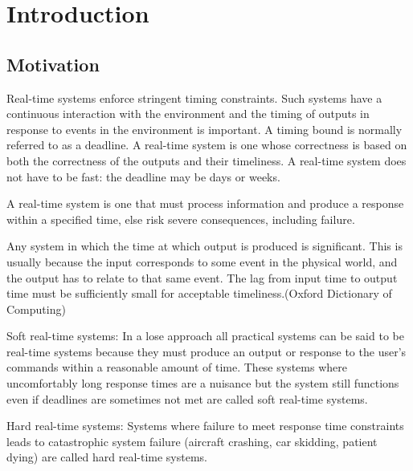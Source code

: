 
\chapter{Introduction}

\section{Motivation}

Real-time systems enforce stringent timing constraints. 
Such systems have a continuous interaction with the environment and the timing of outputs in response to events in the environment is important. 
A timing bound is normally referred to as a deadline. 
A real-time system is one whose correctness is based on both the correctness of the outputs and their timeliness.
A real-time system does not have to be fast: the deadline may be days or weeks.

\begin{myDef}
A real-time system is one that must process information and produce a response within a specified time, else risk severe consequences, including failure.
\end{myDef}

\begin{myDef}
Any system in which the time at which output is produced is significant.
This is usually because the input corresponds to some event in the physical world, and the output has to relate to that same event.
The lag from input time to output time must be sufficiently small for acceptable timeliness.(Oxford Dictionary of Computing)
\end{myDef}

\begin{myDef}
Soft real-time systems: In a lose approach all practical systems can be said to be real-time systems because they must produce an output or response to the user's commands within a reasonable amount of time.
These systems where uncomfortably long response times are a nuisance but the system still functions even if deadlines are sometimes not met are called soft real-time systems.
\end{myDef}

\begin{myDef}
Hard real-time systems: Systems where failure to meet response time constraints leads to catastrophic system failure (aircraft crashing, car skidding, patient dying) are called hard real-time systems.
\end{myDef}

